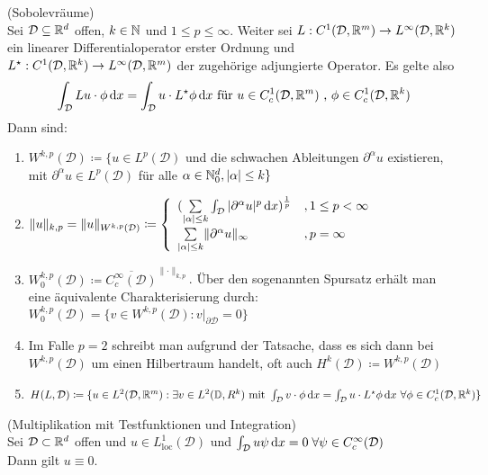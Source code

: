 \begin{Definition}(Sobolevräume)\\
	Sei $\mathcal{D} \subseteq \mathbb{R}^d $ offen, $ k \in \mathbb{N} $ und $ 1 \leq p \leq \infty $.  Weiter sei $ L : C^1(\mathcal{D},\mathbb{R}^m) \to L^{\infty}(\mathcal{D},\mathbb{R}^k) $ ein linearer Differentialoperator erster Ordnung und $ L^{\star} : C^1(\mathcal{D},\mathbb{R}^k) \to L^{\infty}(\mathcal{D},\mathbb{R}^m) $ der zugehörige adjungierte Operator. Es gelte also
	\[
	\int_{\mathcal{D}} Lu \cdot \phi \, \mathrm{d} x = \int_{\mathcal{D}} u \cdot L^{\star} \phi \, \mathrm{d} x \text{ für } u \in C^1_c(\mathcal{D},\mathbb{R}^m) \text{ , } \phi \in C^1_c (\mathcal{D},\mathbb{R}^k)
	\]
	Dann sind:
	\begin{enumerate}[label=(\alph*)]
		\item $ W^{k,p} (\mathcal{D}) \coloneqq \{ u \in L^p(\mathcal{D})$ und die schwachen Ableitungen $ \partial^{\alpha}u $ existieren, mit $ \partial^{\alpha}u \in L^p(\mathcal{D}) $ für alle $ \alpha \in \mathbb{N}_0^d , |\alpha| \leq k \} $	
		\item $ \lVert u \rVert_{k,p} =  \lVert u \rVert_{W^{k,p}(\mathcal{D})} \coloneqq 
				\begin{cases}
					\begin{array}{lll}
						(\sum\limits_{|\alpha|\leq k} \int_{\mathcal{D}} |\partial^{\alpha} u |^p \, \mathrm{d} x)^{\frac{1}{p}} &, 1 \leq p < \infty \\
						\sum\limits_{|\alpha|\leq k}   \lVert \partial^{\alpha} u \rVert_{\infty}        &, p = \infty
					\end{array}
				\end{cases}  $
		\item $ W_0^{k,p}(\mathcal{D}) \coloneqq \overline{ C_c^{\infty}(\mathcal{D}) }^{\lVert \cdot \rVert_{k,p}} $. Über den sogenannten Spursatz erhält man eine äquivalente Charakterisierung durch: 
		$ W_0^{k,p}(\mathcal{D}) = \{ v \in W^{k,p}(\mathcal{D}) : v|_{\partial \mathcal{D}} = 0 \}$
		\item Im Falle $ p = 2 $ schreibt man aufgrund der Tatsache, dass es sich dann bei $ W^{k,p}(\mathcal{D}) $ um einen Hilbertraum handelt, oft auch $ H^k(\mathcal{D}) \coloneqq W^{k,p}(\mathcal{D}) $
		\item $ H(L,\mathcal{D}) \coloneqq \{ u \in L^2(\mathcal{D},\mathbb{R}^m) : \exists v \in L^2(\mathbb{D},R^k) \text{ mit } \int_{\mathcal{D}} v \cdot \phi \, \mathrm{d} x = \int_{\mathcal{D}} u \cdot L^{\star}\phi \, \mathrm{d} x \ \forall \phi \in C^1_c(\mathcal{D},\mathbb{R}^k) \}$
	\end{enumerate}
\end{Definition}

\begin{Satz}(Multiplikation mit Testfunktionen und Integration) \\
	\label{testfunktionen}
	Sei $\mathcal{D} \subset \mathbb{R}^d$ offen und $u \in L_{\text{loc}}^1(\mathcal{D})$ und $\int_{\mathcal{D}} u \psi \, \mathrm{d} x = 0 \; \forall \psi \in C_c^{\infty}(\mathcal{D})$ \\
	Dann gilt $ u \equiv 0 $.
\end{Satz}
